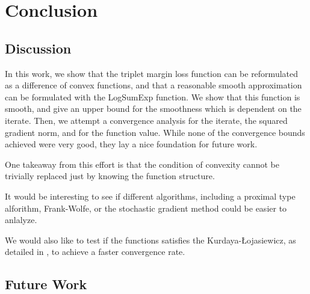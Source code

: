 \documentclass[11pt]{article}
\begin{document}



\section{Conclusion}

\subsection{Discussion}

In this work, we show that the triplet margin loss function can be reformulated as a difference of convex functions, and that a reasonable smooth approximation can be formulated with the LogSumExp function. We show that this function is smooth, and give an upper bound for the smoothness which is dependent on the iterate. Then, we attempt a convergence analysis for the iterate, the squared gradient norm, and for the function value. While none of the convergence bounds achieved were very good, they lay a nice foundation for future work.

One takeaway from this effort is that the condition of convexity cannot be trivially replaced just by knowing the function structure. 

It would be interesting to see if different algorithms, including a proximal type alforithm, Frank-Wolfe, or the stochastic gradient method could be easier to anlalyze.

We would also like to test if the functions satisfies the Kurdaya-Łojasiewicz, as detailed in \cite{khamaru_convergence_2018}, to achieve a faster convergence rate.

\subsection{Future Work}
\end{document}
